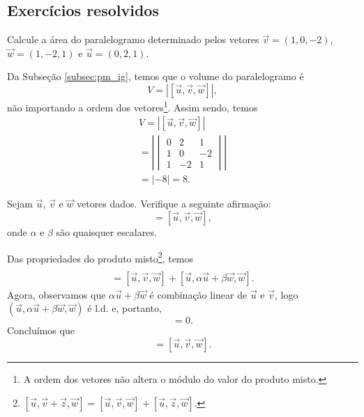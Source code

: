 \subsection*{Exercícios resolvidos}

\begin{exeresol}
  Calcule a área do paralelogramo determinado pelos vetores $\vec{v}=(1,0,-2)$, $\vec{w}=(1,-2,1)$ e $\vec{u}=(0,2,1)$.
\end{exeresol}
\begin{resol}
  Da Subseção \ref{subsec:pm_ig}, temos que o volume do paralelogramo é
  \begin{equation}
    V = |[\vec{u},\vec{v},\vec{w}]|,
  \end{equation}
  não importando a ordem dos vetores\footnote{A ordem dos vetores não altera o módulo do valor do produto misto.}. Assim sendo, temos
  \begin{gather}
    V = |[\vec{u},\vec{v},\vec{w}]| \\
    = \left|
      \begin{vmatrix}
        0 & 2 & 1 \\
        1 & 0 & -2 \\
        1 & -2 & 1 
      \end{vmatrix}
    \right| \\
    = |-8| = 8.
  \end{gather}
\end{resol}

\begin{exeresol}
  Sejam $\vec{u}$, $\vec{v}$ e $\vec{w}$ vetores dados. Verifique a seguinte afirmação:
  \begin{equation}
    [\vec{u},\vec{v}+\alpha\vec{u}+\beta\vec{w},\vec{w}]=[\vec{u},\vec{v},\vec{w}],
  \end{equation}
  onde $\alpha$ e $\beta$ são quaisquer escalares.
\end{exeresol}
\begin{resol}
  Das propriedades do produto misto\footnote{$[\vec{u},\vec{v}+\vec{z},\vec{w}]=[\vec{u},\vec{v},\vec{w}]+[\vec{u},\vec{z},\vec{w}]$.}, temos
  \begin{gather}
    [\vec{u},\vec{v}+\alpha\vec{u}+\beta\vec{w},\vec{w}] \\
    = [\vec{u},\vec{v},\vec{w}] + [\vec{u},\alpha\vec{u}+\beta\vec{w},\vec{w}].
  \end{gather}
  Agora, observamos que $\alpha\vec{u}+\beta\vec{w}$ é combinação linear de $\vec{u}$ e $\vec{v}$, logo $(\vec{u}, \alpha\vec{u}+\beta\vec{w}, \vec{w})$ é l.d. e, portanto,
  \begin{equation}
    [\vec{u},\alpha\vec{u}+\beta\vec{w},\vec{w}] = 0.
  \end{equation}
  Concluímos que
  \begin{equation}
  [\vec{u},\vec{v}+\alpha\vec{u}+\beta\vec{w},\vec{w}]=[\vec{u},\vec{v},\vec{w}].  
  \end{equation}
\end{resol}



